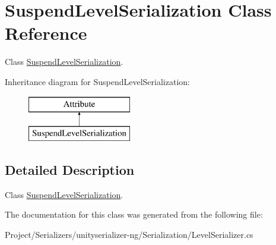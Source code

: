 \hypertarget{class_suspend_level_serialization}{}\section{Suspend\+Level\+Serialization Class Reference}
\label{class_suspend_level_serialization}


Class \hyperlink{class_suspend_level_serialization}{Suspend\+Level\+Serialization}.  


Inheritance diagram for Suspend\+Level\+Serialization\+:\begin{figure}[H]
\begin{center}
\leavevmode
\includegraphics[height=2.000000cm]{class_suspend_level_serialization}
\end{center}
\end{figure}


\subsection{Detailed Description}
Class \hyperlink{class_suspend_level_serialization}{Suspend\+Level\+Serialization}. 



The documentation for this class was generated from the following file\+:\begin{DoxyCompactItemize}
\item 
Project/\+Serializers/unityserializer-\/ng/\+Serialization/Level\+Serializer.\+cs\end{DoxyCompactItemize}
